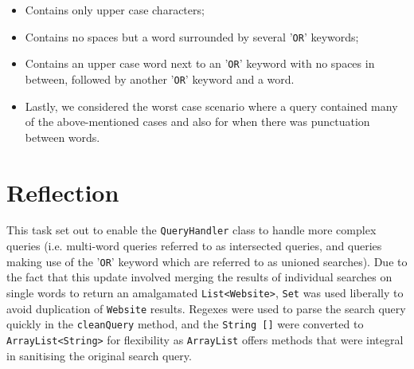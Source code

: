 \begin{itemize}
\begin{itemize}
        \item Contains only upper case characters;
        \item Contains no spaces but a word surrounded by several '{\tt OR}' keywords;
        \item Contains an upper case word next to an '{\tt OR}' keyword with no spaces in between, followed by another '{\tt OR}' keyword and a word.
        \item Lastly, we considered the worst case scenario where a query contained many of the above-mentioned cases and also for when there was punctuation between words.
    \end{itemize}
\end{itemize}

\section{Reflection} %
This task set out to enable the {\tt QueryHandler} class to handle more complex queries (i.e. multi-word queries referred to as intersected queries, and queries making use of the '{\tt OR}' keyword which are referred to as unioned searches).
Due to the fact that this update involved merging the results of individual searches on single words to return an amalgamated {\tt List<Website>}, {\tt Set} was used liberally to avoid duplication of {\tt Website} results.
Regexes were used to parse the search query quickly in the {\tt cleanQuery} method, and the {\tt String []} were converted to {\tt ArrayList<String>} for flexibility as {\tt ArrayList} offers methods that were integral in sanitising the original search query.


